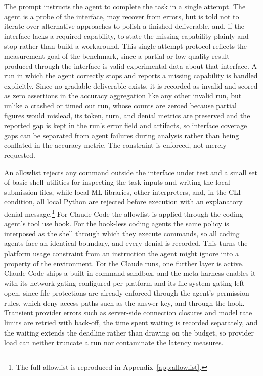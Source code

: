 \documentclass[
english,                 %
bibtex,                  %
]{kththesis}
\numberwithin{listing}{chapter}
\begin{document}
The prompt instructs the agent to complete the task in a single attempt. The agent is a probe of the interface, may recover from errors, but is told not to iterate over alternative approaches to polish a finished deliverable, and, if the interface lacks a required capability, to state the missing capability plainly and stop rather than build a workaround. This single attempt protocol reflects the measurement goal of the benchmark, since a partial or low quality result produced through the interface is valid experimental data about that interface. A run in which the agent correctly stops and reports a missing capability is handled explicitly. Since no gradable deliverable exists, it is recorded as invalid and scored as zero assertions in the accuracy aggregation like any other invalid run, but unlike a crashed or timed out run, whose counts are zeroed because partial figures would mislead, its token, turn, and denial metrics are preserved and the reported gap is kept in the run's error field and artifacts, so interface coverage gaps can be separated from agent failures during analysis rather than being conflated in the accuracy metric. The constraint is enforced, not merely requested.

An allowlist rejects any command outside the interface under test and a small set of basic shell utilities for inspecting the task inputs and writing the local submission files, while local \gls{ML} libraries, other interpreters, and, in the \gls{CLI} condition, all local Python are rejected before execution with an explanatory denial message.\footnote{The full allowlist is reproduced in Appendix~\ref{app:allowlist}.} For Claude Code the allowlist is applied through the coding agent's tool use hook. For the hook-less coding agents the same policy is interposed as the shell through which they execute commands, so all coding agents face an identical boundary, and every denial is recorded. This turns the platform usage constraint from an instruction the agent might ignore into a property of the environment. For the Claude runs, one further layer is active. Claude Code ships a built-in command sandbox, and the meta-harness enables it with its network gating configured per platform and its file system gating left open, since file protections are already enforced through the agent's permission rules, which deny access paths such as the answer key, and through the hook. Transient provider errors such as server-side connection closures and model rate limits are retried with back-off, the time spent waiting is recorded separately, and the waiting extends the deadline rather than drawing on the budget, so provider load can neither truncate a run nor contaminate the latency measures.
\end{document}

